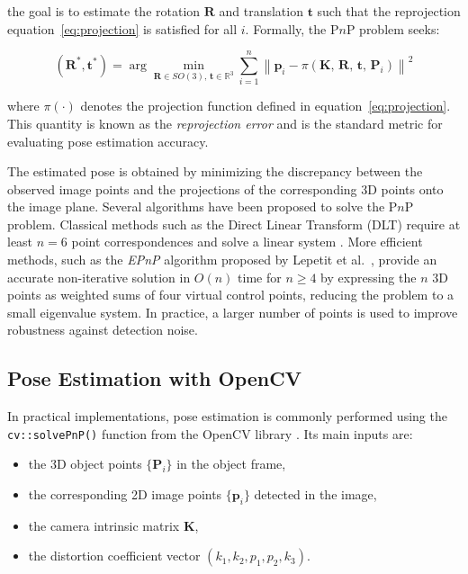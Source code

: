 \noindent the goal is to estimate the rotation $\mathbf{R}$ and translation
$\mathbf{t}$ such that the reprojection equation~\eqref{eq:projection} is
satisfied for all $i$. Formally, the P$n$P problem seeks:


\begin{equation}
	(\mathbf{R}^*, \mathbf{t}^*) =
	\arg\min_{\mathbf{R} \in SO(3),\, \mathbf{t} \in \mathbb{R}^3}
	\sum_{i=1}^{n}
	\left\|
	\mathbf{p}_i -
	\pi\!\left(\mathbf{K},\, \mathbf{R},\, \mathbf{t},\, \mathbf{P}_i\right)
	\right\|^2
	\label{eq:pnp_reprojection}
\end{equation}

\noindent where $\pi(\cdot)$ denotes the projection function defined in
equation~\eqref{eq:projection}. This quantity is known as the
\textit{reprojection error} and is the standard metric for evaluating pose
estimation accuracy.

The estimated pose is obtained by minimizing the discrepancy
between the observed image points and the projections of the
corresponding 3D points onto the image plane.
Several algorithms have been proposed to solve the P$n$P problem. Classical
methods such as the Direct Linear Transform (DLT) require at least $n = 6$
point correspondences and solve a linear system \cite{hartley2004multiple}.
More efficient methods, such as the \textit{EPnP} algorithm proposed by Lepetit
et al.\ \cite{lepetit2009epnp}, provide an accurate non-iterative solution in
$O(n)$ time for $n \geq 4$ by expressing the $n$ 3D points as weighted sums
of four virtual control points, reducing the problem to a small eigenvalue
system. In practice, a larger number of points is used to improve robustness
against detection noise.

\subsection{Pose Estimation with OpenCV}
\label{subsec:pnp_opencv}

In practical implementations, pose estimation is commonly performed using the
\texttt{cv::solvePnP()} function from the OpenCV library
\cite{bradski2008learning}. Its main inputs are:
\begin{itemize}
    \item the 3D object points $\{\mathbf{P}_i\}$ in the object frame,
    \item the corresponding 2D image points $\{\mathbf{p}_i\}$ detected in
    the image,
    \item the camera intrinsic matrix $\mathbf{K}$,
    \item the distortion coefficient vector $(k_1, k_2, p_1, p_2, k_3)$.
\end{itemize}

